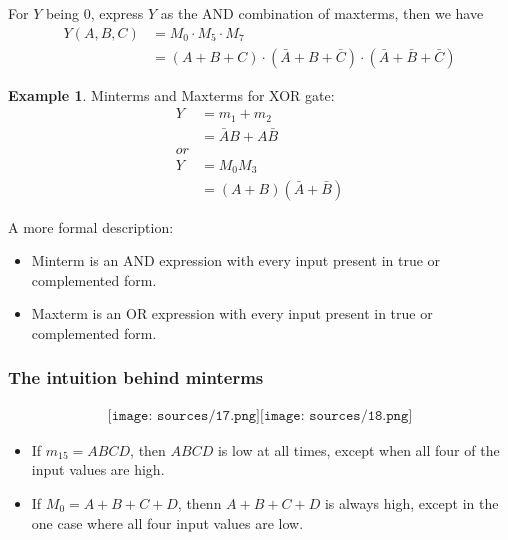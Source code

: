\documentclass[12pt]{article}
\theoremstyle{definition}
\newtheorem{example}{Example}[section]
\begin{document}
For $Y$ being 0, express $Y$ as the AND combination of maxterms, then we have
\begin{align*}
    Y(A,B,C)&=M_0\cdot M_5\cdot M_7\\
    &=(A+B+C)\cdot(\bar{A}+B+\bar{C})\cdot(\bar{A}+\bar{B}+\bar{C})
\end{align*}
\begin{example}
    Minterms and Maxterms for XOR gate:
    \begin{align*}
        Y&=m_1+m_2\\
        &=\bar{A}B+A\bar{B}\\
        or\\
        Y&=M_0M_3\\
        &=(A+B)(\bar{A}+\bar{B})
    \end{align*}
\end{example}
A more formal description:
\begin{itemize}
    \item Minterm is an AND expression with every input present in true or complemented form.
    \item Maxterm is an OR expression with every input present in true or complemented form.
\end{itemize}
\subsubsection{The intuition behind minterms}
\begin{align*}
    \texttt{[image: sources/17.png]}
    \texttt{[image: sources/18.png]}
\end{align*}
\begin{itemize}
    \item If $m_{15}=ABCD$, then $ABCD$ is low at all times, except when all four of the input values are high.
    \item If $M_0=A+B+C+D$, thenn $A+B+C+D$ is always high, except in the one case where all four input values are low.
\end{itemize}
\end{document}
